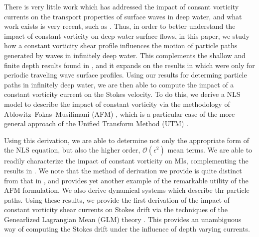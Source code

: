 \documentclass[a4paper,11pt]{article}
\begin{document}
There is very little work which has addressed the impact of consant vorticity currents on the transport properties of surface waves in deep water, and what work exists is very recent, such as \cite{nachbin}.  Thus, in order to better understand the impact of constant vorticity on deep water surface flows, in this paper, we study how a constant vorticity shear profile influences the motion of particle paths generated by waves in infinitely deep water.  This complements the shallow and finite depth results found in \cite{constantin,borluk}, and it expands on the results in \cite{nachbin} which were only for periodic traveling wave surface profiles.   Using our results for determing particle paths in infinitely deep water, we are then able to compute the impact of a constant vorticity current on the Stokes velocity.  To do this, we derive a NLS model to describe the impact of constant vorticity via the methodology of Ablowitz--Fokas--Musilimani (AFM) \cite{afm,ashton}, which is a particular case of the more general approach of the Unified Transform Method (UTM) \cite{fokas2008}.  

Using this derivation, we are able to determine not only the appropriate form of the NLS equation, but also the higher order, $\mathcal{O}(\epsilon^{2})$ mean terms.  We are able to readily characterize the impact of constant vorticity on MIs, complementing the results in \cite{thomas2012nonlinear}.  We note that the method of derivation we provide is quite distinct from that in \cite{thomas2012nonlinear}, and provides yet another example of the remarkable utility of the AFM formulation.  We also derive dynamical systems which describe thr particle paths.  Using these results, we provide the first derivation of the impact of constant vorticity shear currents on Stokes drift via the techniques of  the Genearlized Lagrangian Mean (GLM) theory \cite{andrews,buhler}.  This provides an unambiguous way of computing the Stokes drift under the influence of depth varying currents.
\end{document}
